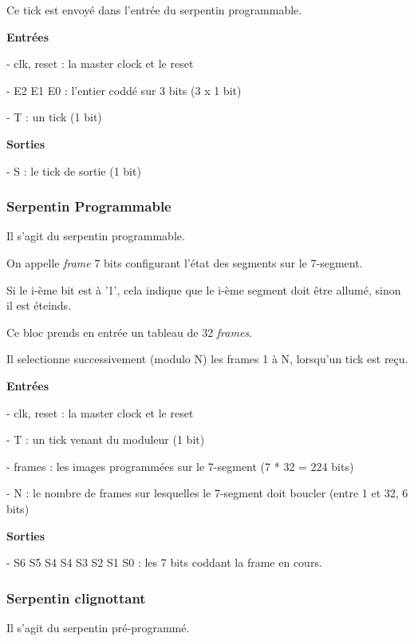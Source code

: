 \documentclass[10pt]{article}
\begin{document}
        Ce tick est envoyé dans l'entrée du serpentin programmable.

        \textbf{Entrées}
        
            - clk, reset : la master clock et le reset

            - E2 E1 E0 : l'entier coddé sur 3 bits (3 x 1 bit)

            - T : un tick (1 bit)
                            
        \textbf{Sorties}
            
            - S : le tick de sortie (1 bit)
        
        \subsubsection{Serpentin Programmable}
        
        Il s'agit du serpentin programmable.
        
        On appelle \textit{frame} 7 bits configurant l'état des segments sur le 7-segment.

        Si le i-ème bit est à '1', cela indique que le i-ème segment doit être allumé, sinon il est éteinds.
        
        Ce bloc prends en entrée un tableau de 32 \textit{frames}.
        
        Il selectionne successivement (modulo N) les frames 1 à N, lorsqu'un tick est reçu.

        \textbf{Entrées}
        
            - clk, reset : la master clock et le reset

            - T : un tick venant du moduleur (1 bit)
            
            - frames : les images programmées sur le 7-segment (7 * 32 = 224 bits)
            
            - N : le nombre de frames sur lesquelles le 7-segment doit boucler (entre 1 et 32, 6 bits)
            
        \textbf{Sorties}
            
            - S6 S5 S4 S4 S3 S2 S1 S0 : les 7 bits coddant la frame en cours.
        
        \subsubsection{Serpentin clignottant}
        
        Il s'agit du serpentin pré-programmé.
        
\end{document}
